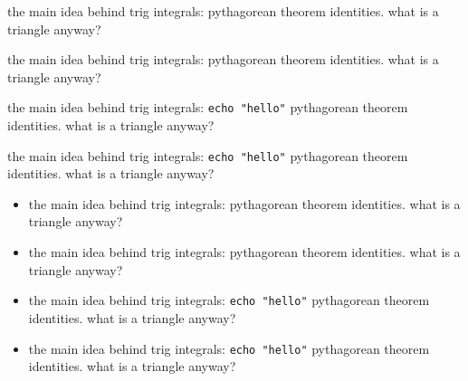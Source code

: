 \documentclass{article}
\begin{document}
the main idea behind trig integrals: pythagorean theorem identities.
what is a triangle anyway?

the main idea behind trig integrals:
%
pythagorean theorem identities. what is a triangle anyway?

the main idea behind trig integrals:
%
\texttt{echo "hello"}
pythagorean theorem identities. what is a triangle anyway?

the main idea behind trig integrals:
%
\texttt{echo "hello"}
%
pythagorean theorem identities. what is a triangle anyway?

\begin{itemize}

	\item the main idea behind trig integrals: pythagorean theorem
	      identities. what is a triangle anyway?

	\item the main idea behind trig integrals:
	      pythagorean theorem identities. what is a triangle anyway?

	\item the main idea behind trig integrals:
	      \texttt{echo "hello"}
	      pythagorean theorem identities. what is a triangle anyway?

	\item the main idea behind trig integrals:
	      \texttt{echo "hello"}
	      pythagorean theorem identities. what is a triangle anyway?

\end{itemize}
\end{document}

